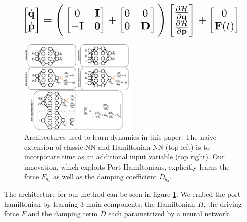 \documentclass[twoside]{article}
\begin{document}
\begin{equation}
\resizebox{0.9\linewidth}{!}{$%
\begin{bmatrix}
\dot{\mathbf{q}} \\
\dot{\mathbf{p}}
\end{bmatrix}
=
\Bigg(\begin{bmatrix}
0 & \mathbf{I} \\
-\mathbf{I} & 0
\end{bmatrix} +
\begin{bmatrix}
0 & 0 \\
0 & \mathbf{D}
\end{bmatrix}
 \Bigg)
 \begin{bmatrix}
\frac{\partial \mathcal{H}}{\partial \mathbf{q}} \\
\frac{\partial \mathcal{H}}{\partial \mathbf{p}}
\end{bmatrix}
+
\begin{bmatrix}
0 \\
\mathbf{F}(t)
\end{bmatrix}
$%
}%
\label{eqn.pham1}
\end{equation}
\begin{figure}[h!]
\centering
\includegraphics[width=0.5\textwidth]{figures/architect.png}
\caption{Architectures used to learn dynamics in this paper. The naive extension of classic NN and Hamiltonian NN (top left) is to incorporate time as an additional input variable (top right). Our innovation, which exploits Port-Hamiltonians, explicitly learns the force $F_{\theta_2}$ as well as the damping coefficient $D_{\theta_3}$.}
\label{fig.architecture}
\end{figure}

The architecture for our method can be seen in figure \ref{fig.architecture}. We embed the port-hamiltonian by learning 3 main components: the Hamiltonian $H$, the driving force $F$ and the damping term $D$ each parametrized by a neural network.
\end{document}
